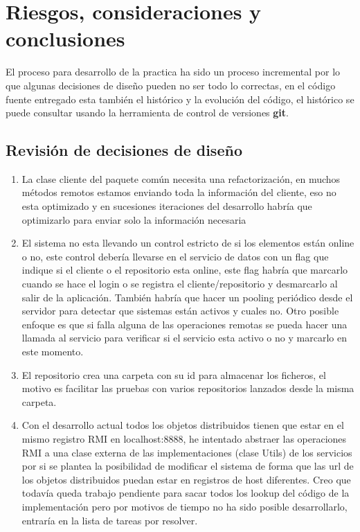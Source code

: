 \chapter{Riesgos, consideraciones y conclusiones}

El proceso para desarrollo de la practica ha sido un proceso incremental por lo que algunas decisiones de diseño pueden no ser todo lo correctas, en el código fuente entregado esta también el histórico y la evolución del código, el histórico se puede consultar usando la herramienta de control de versiones \textbf{git}.

\section{Revisión de decisiones de diseño}

\begin{enumerate}\label{sec:consideraciones_datos}
	\item La clase cliente del paquete común necesita una refactorización, en muchos métodos remotos estamos enviando toda la información del cliente, eso no esta optimizado y en sucesiones iteraciones del desarrollo habría que optimizarlo para enviar solo la información necesaria
	\item El sistema no esta llevando un control estricto de si los elementos están online o no, este control debería llevarse en el servicio de datos con un flag que indique si el cliente o el repositorio esta online, este flag habría que marcarlo cuando se hace el login o se registra el cliente/repositorio y desmarcarlo al salir de la aplicación. También habría que hacer un pooling periódico desde el servidor para detectar que sistemas están activos y cuales no. Otro posible enfoque es que si falla alguna de las operaciones remotas se pueda hacer una llamada al servicio para verificar si el servicio esta activo o no y marcarlo en este momento.
	\item El repositorio crea una carpeta con su id para almacenar los ficheros, el motivo es facilitar las pruebas con varios repositorios lanzados desde la misma carpeta.
	\item Con el desarrollo actual todos los objetos distribuidos tienen que estar en el mismo registro RMI en localhost:8888, he intentado abstraer las operaciones RMI a una clase externa de las implementaciones (clase Utils) de los servicios por si se plantea la posibilidad de modificar el sistema de forma que las url de los objetos distribuidos puedan estar en registros de host diferentes. Creo que todavía queda trabajo pendiente para sacar todos los lookup del código de la implementación pero por motivos de tiempo no ha sido posible desarrollarlo, entraría en la lista de tareas por resolver.
\end{enumerate}
